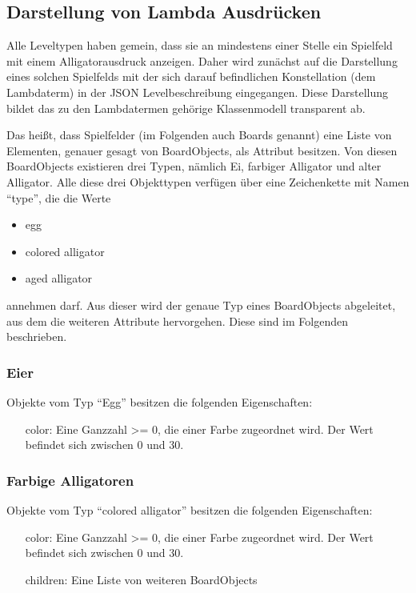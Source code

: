 \subsection{Darstellung von Lambda Ausdrücken}
Alle Leveltypen haben gemein, dass sie an mindestens einer Stelle ein Spielfeld mit einem Alligatorausdruck anzeigen.
Daher wird zunächst auf die Darstellung eines solchen Spielfelds mit der sich darauf befindlichen Konstellation (dem Lambdaterm) in der JSON Levelbeschreibung eingegangen.
Diese Darstellung bildet das zu den Lambdatermen gehörige Klassenmodell transparent ab.


Das heißt, dass Spielfelder (im Folgenden auch Boards genannt) eine Liste von Elementen, genauer gesagt von BoardObjects, als Attribut besitzen.
Von diesen BoardObjects existieren drei Typen, nämlich Ei, farbiger Alligator und alter Alligator.
Alle diese drei Objekttypen verfügen über eine Zeichenkette mit Namen "`type"', die die Werte
\begin{itemize}
	\item egg
	\item colored alligator
	\item aged alligator
\end{itemize}
annehmen darf.
Aus dieser wird der genaue Typ eines BoardObjects abgeleitet, aus dem die weiteren Attribute hervorgehen.
Diese sind im Folgenden beschrieben.

\subsubsection{Eier}
Objekte vom Typ "`Egg"' besitzen die folgenden Eigenschaften:
\begin{itemize}
	\item[color:] Eine Ganzzahl >= 0, die einer Farbe zugeordnet wird. Der Wert befindet sich zwischen 0 und 30.
\end{itemize}

\subsubsection{Farbige Alligatoren}
Objekte vom Typ "`colored alligator"' besitzen die folgenden Eigenschaften:
\begin{itemize}
	\item[color:] Eine Ganzzahl >= 0, die einer Farbe zugeordnet wird. Der Wert befindet sich zwischen 0 und 30.
	\item[children:] Eine Liste von weiteren BoardObjects
\end{itemize}

